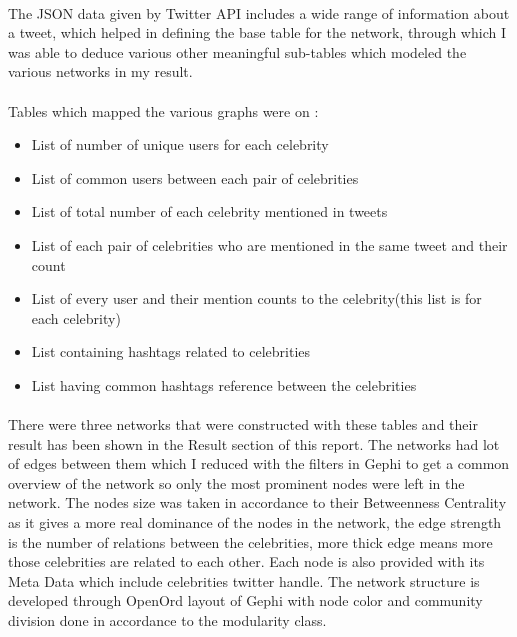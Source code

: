 \documentclass[runningheads,a4paper]{llncs}
\begin{document}
\paragraph{}
The JSON data given by Twitter API includes a wide range of information about a tweet, which helped in defining the base table for the network, through which I was able to deduce various other meaningful sub-tables which modeled the various networks in my result.

\paragraph{}
Tables which mapped the various graphs were on :

\begin{itemize}

\item List of number of unique users for each celebrity

\item List of common users between each pair of celebrities

\item List of total number of each celebrity mentioned in tweets

\item List of each pair of celebrities who are mentioned in the same tweet and their count

\item List of every user and their mention counts to the celebrity(this list is for each celebrity)

\item List containing hashtags related to celebrities

\item List having common hashtags reference between the celebrities

\end{itemize}

\paragraph{}
There were three networks that were constructed with these tables and their result has been shown in the Result section of this report. The networks had lot of edges between them which I reduced with the filters in Gephi to get a common overview of the network so only the most prominent nodes were left in the network. The nodes size was taken in accordance to their Betweenness Centrality as it gives a more real dominance of the nodes in the network, the edge strength is the number of relations between the celebrities, more thick edge means more those celebrities are related to each other. Each node is also provided with its Meta Data which include celebrities twitter handle. The network structure is developed through OpenOrd layout of Gephi with node color and community division done in accordance to the modularity class.
\end{document}
